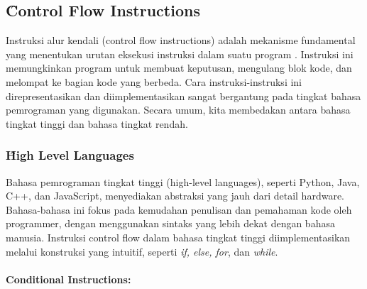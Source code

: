 \subsection{\f{Control Flow Instructions}}
Instruksi alur kendali (control flow instructions) adalah mekanisme fundamental yang menentukan urutan eksekusi instruksi dalam suatu program \cite{cod23}. Instruksi ini memungkinkan program untuk membuat keputusan, mengulang blok kode, dan melompat ke bagian kode yang berbeda. Cara instruksi-instruksi ini direpresentasikan dan diimplementasikan sangat bergantung pada tingkat bahasa pemrograman yang digunakan. Secara umum, kita membedakan antara bahasa tingkat tinggi dan bahasa tingkat rendah.

\subsubsection{\f{High Level Languages}}
Bahasa pemrograman tingkat tinggi (high-level languages), seperti Python, Java, C++, dan JavaScript, menyediakan abstraksi yang jauh dari detail hardware. Bahasa-bahasa ini fokus pada kemudahan penulisan dan pemahaman kode oleh programmer, dengan menggunakan sintaks yang lebih dekat dengan bahasa manusia. Instruksi control flow dalam bahasa tingkat tinggi diimplementasikan melalui konstruksi yang intuitif, seperti \textit{if, else, for}, dan \textit{while}.

\paragraph{Conditional Instructions:}

